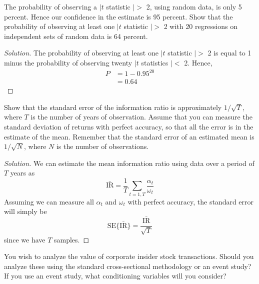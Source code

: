 \begin{problem}{12.4}
  The probability of observing a $|t$ statistic $|>$ 2, using random data, is only 5 percent. Hence our confidence in the estimate is 95 percent. Show that the probability of observing at least one $|t$ statistic  $|>$ 2 with 20 regressions on independent sets of random data is 64 percent.
\end{problem}

\begin{proof}[Solution]
  The probability of observing at least one $|t$ statistic $|>$ 2 is equal to 1 minus the probability of observing twenty $|t$ statistics $|<$ 2. Hence,
  \begin{align*}
   P  &= 1 - 0.95^{20}\\
      &= 0.64
  \end{align*}

\end{proof}

\begin{problem}{12.5}
  Show that the standard error of the information ratio is approximately $1/\sqrt{T}$, where $T$ is the number of years of observation. Assume that you can measure the standard deviation of returns with perfect accuracy, so that all the error is in the estimate of the mean. Remember that the standard error of an estimated mean is $1/\sqrt{N}$, where $N$ is the number of observations.
\end{problem}

\begin{proof}[Solution]
  We can estimate the mean information ratio using data over a period of $T$ years as
  \begin{equation*}
   \mathrm{\bar{IR}} = \frac{1}{T}\sum_{t=1,T}\frac{\alpha_{t}}{\omega_{t}}
  \end{equation*}
  Assuming we can measure all $\alpha_{t}$ and $\omega_{t}$ with perfect accuracy, the standard error will simply be
  \begin{equation*}
   \mathrm{SE\{\bar{IR}\}}=\frac{\mathrm{\bar{IR}}}{\sqrt{T}}
  \end{equation*}
  since we have $T$ samples.
  
\end{proof}

\begin{problem}{12.6}
  You wish to analyze the value of corporate insider stock transactions. Should you analyze these using the standard cross-sectional methodology or an event study? If you use an event study, what conditioning variables will you consider?
\end{problem}

